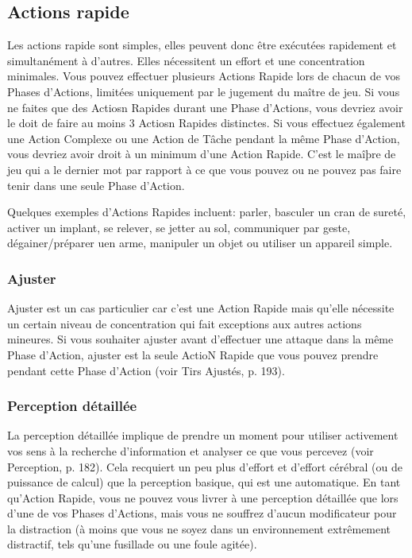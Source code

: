 \subsection{Actions rapide} \label{sec:combat-quick-actions} 

Les actions rapide sont simples, elles peuvent donc être exécutées rapidement et simultanément à d'autres. Elles nécessitent un effort et une concentration minimales. Vous pouvez effectuer plusieurs Actions Rapide lors de chacun de vos Phases d'Actions, limitées uniquement par le jugement du maître de jeu. Si vous ne faites que des Actiosn Rapides durant une Phase d'Actions, vous devriez avoir le doit de faire au moins 3 Actiosn Rapides distinctes. Si vous effectuez également une Action Complexe ou une Action de Tâche pendant la même Phase d'Action, vous devriez avoir droit à un minimum d'une Action Rapide. C'est le maîþre de jeu qui a le dernier mot par rapport à ce que vous pouvez ou ne pouvez pas faire tenir dans une seule Phase d'Action. 

Quelques exemples d'Actions Rapides incluent: parler, basculer un cran de sureté, activer un implant, se relever, se jetter au sol, communiquer par geste, dégainer/préparer uen arme, manipuler un objet ou utiliser un appareil simple. 



\subsubsection{Ajuster} 

Ajuster est un cas particulier car c'est une Action Rapide mais qu'elle nécessite un certain niveau de concentration qui fait exceptions aux autres actions mineures. Si vous souhaiter ajuster avant d'effectuer une attaque dans la même Phase d'Action, ajuster est la seule ActioN Rapide que vous pouvez prendre pendant cette Phase d'Action (voir Tirs Ajustés, p. 193). 

\subsubsection{Perception détaillée} 

La perception détaillée implique de prendre un moment pour utiliser activement vos sens à la recherche d'information et analyser ce que vous percevez (voir Perception, p. 182). Cela recquiert un peu plus d'effort et d'effort cérébral (ou de puissance de calcul) que la perception basique, qui est une automatique. En tant qu'Action Rapide, vous ne pouvez vous livrer à une perception détaillée que lors d'une de vos Phases d'Actions, mais vous ne souffrez d'aucun modificateur pour la distraction (à moins que vous ne soyez dans un environnement extrêmement distractif, tels qu'une fusillade ou une foule agitée). 



